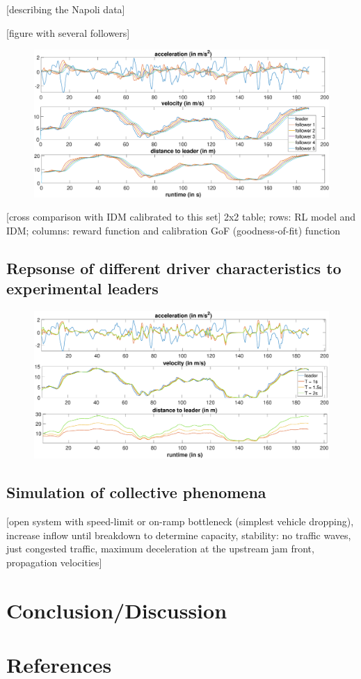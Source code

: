\documentclass[review]{elsarticle}
\begin{document}
[describing the Napoli data]

[figure with several followers]

\begin{figure}
	\centering
	\includegraphics[width=12cm]{images/PunzoKolonne}
	\caption{}
	\label{fig:PunzoKolonne}
\end{figure}

[cross comparison with IDM calibrated to this set]
2x2 table; rows: RL model and IDM;
columns: reward function and calibration GoF (goodness-of-fit) function

\subsection{Repsonse of different driver characteristics to experimental leaders }

\begin{figure}
	\centering
	\includegraphics[width=12cm]{images/differentT}
	\caption{}
	\label{fig:differentT}
\end{figure}


\subsection{Simulation of collective phenomena}

[open system with speed-limit or on-ramp bottleneck (simplest vehicle
  dropping), increase inflow until breakdown to determine capacity,
  stability: no traffic waves, just congested traffic, maximum
  deceleration at the upstream jam front, propagation velocities]


\section{Conclusion/Discussion}

\section*{References}


\end{document}
